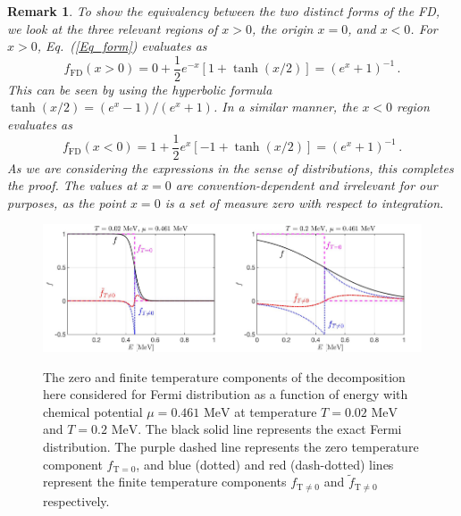 \documentclass[sn-mathphys,Numbered]{sn-jnl}
\newcommand{\req}[1]{Eq.~(\ref{#1})}
\newcommand*{\MeV}{\text{ MeV}}
\newcommand{\rev}[1]{{\color{blue}#1}}
\newtheorem{remark}{Remark}
\begin{document}
\begin{remark}
To show the equivalency between the two distinct forms of the FD, we look at the three relevant regions of $x>0$, the origin $x=0$, and $x<0$. For $x>0$, \req{Eq_form} evaluates as
\begin{equation}\label{eq:xpos}
     f_\mathrm{FD}(x>0) = 0 + \frac{1}{2}e^{-x}[1+\tanh(x/2)] = (e^x + 1)^{-1}\,.
 \end{equation}
 This can be seen by using the hyperbolic formula $\tanh(x/2)=(e^x-1)/(e^x+1)$. In a similar manner, the $x<0$ region evaluates as
 \begin{equation}\label{eq:xneg}
     f_\mathrm{FD}(x<0) = 1 + \frac{1}{2}e^{x}[-1 + \tanh(x/2)] = (e^x + 1)^{-1}\,.
 \end{equation}
 As we are considering the expressions in the sense of distributions, this completes the proof.  The values at $x=0$ are convention-dependent and irrelevant for our purposes, as the point $x=0$ is a set of measure zero with respect to integration.
\end{remark}
\begin{figure}[ht]
\centering
\includegraphics[width=0.5\textwidth]{./plot/FermiZeorFiniteTemperature}\includegraphics[width=0.5\textwidth]{./plot/FermiZeroFiniteTemperature002}
\caption{%
The zero and finite temperature components of the decomposition here considered for Fermi distribution as a function of energy with chemical potential $\mu=0.461\MeV$ at temperature $T=0.02\MeV$ and $T=0.2\MeV$. The black solid line represents the exact Fermi distribution. The purple dashed line represents the zero temperature component $f_{\mathrm{T}=0}$, and blue (dotted) and red (dash-dotted) lines represent the finite temperature components $f_\mathrm{T\neq0}$ and $\widetilde f_\mathrm{T\neq0}$ respectively.
}
\label{Fermi_Component}
\end{figure}
\end{document}
